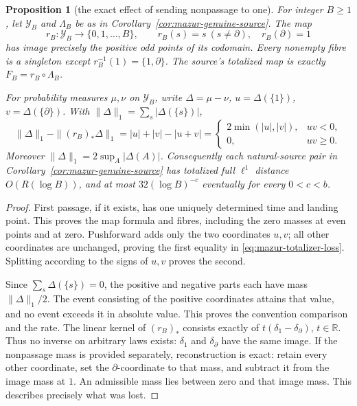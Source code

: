 \documentclass[11pt]{article}
\newtheorem{proposition}{Proposition}
\theoremstyle{remark}\newtheorem{remark}[proposition]{Remark}
\begin{document}
\begin{proposition}[the exact effect of sending nonpassage to one]
\label{prop:mazur-totalizer-exact}
For integer \(B\ge1\), let \(\mathcal Y_B\) and \(\Lambda_B\) be as in
Corollary~\ref{cor:mazur-genuine-source}. The map
\[
 r_B:\mathcal Y_B\longrightarrow\{0,1,\ldots,B\},\qquad
 r_B(s)=s\ (s\ne\partial),\quad r_B(\partial)=1
\]
has image precisely the positive odd points of its codomain. Every
nonempty fibre is a singleton except \(r_B^{-1}(1)=\{1,\partial\}\).
The source's totalized map is exactly \(F_B=r_B\circ\Lambda_B\).

For probability measures \(\mu,\nu\) on \(\mathcal Y_B\), write
\(\Delta=\mu-\nu\), \(u=\Delta(\{1\})\), \(v=\Delta(\{\partial\})\).
With \(\|\Delta\|_1=\sum_s|\Delta(\{s\})|\),
\begin{equation}
 \|\Delta\|_1-\|(r_B)_*\Delta\|_1
 =|u|+|v|-|u+v|
 =\begin{cases}2\min(|u|,|v|),&uv<0,\\0,&uv\ge0.\end{cases}
 \label{eq:mazur-totalizer-loss}
\end{equation}
Moreover \(\|\Delta\|_1=2\sup_A|\Delta(A)|\).
Consequently each natural-source pair in
Corollary~\ref{cor:mazur-genuine-source} has totalized full \(\ell^1\)
distance \(O(R(\log B))\), and at most \(32(\log B)^{-c}\)
eventually for every \(0<c<b\).
\end{proposition}
\begin{proof}
First passage, if it exists, has one uniquely determined time and
landing point. This proves the map formula and fibres, including the
zero masses at even points and at zero. Pushforward adds only the two
coordinates \(u,v\); all other coordinates are unchanged, proving
the first equality in \eqref{eq:mazur-totalizer-loss}. Splitting
according to the signs of \(u,v\) proves the second.

Since \(\sum_s\Delta(\{s\})=0\), the positive and negative parts each
have mass \(\|\Delta\|_1/2\). The event consisting of the positive
coordinates attains that value, and no event exceeds it in absolute
value. This proves the convention comparison and the rate.
The linear kernel of \((r_B)_*\) consists exactly of
\(t(\delta_1-\delta_\partial)\), \(t\in\mathbb R\).
Thus no inverse on arbitrary laws exists: \(\delta_1\) and
\(\delta_\partial\) have the same image. If the nonpassage mass is
provided separately, reconstruction is exact: retain every other
coordinate, set the \(\partial\)-coordinate to that mass, and subtract
it from the image mass at \(1\). An admissible mass lies between zero
and that image mass. This describes precisely what was lost.
\end{proof}
\end{document}
